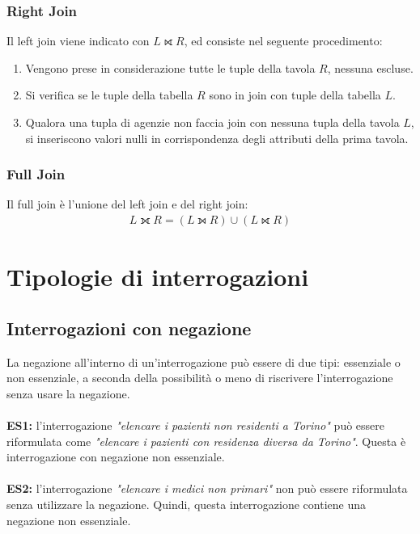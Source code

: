 \subsection{Right Join}
Il left join viene indicato con $L \rightouterjoin R$, ed consiste nel seguente procedimento:
    \begin{enumerate}
        \item{Vengono prese in considerazione tutte le tuple della tavola $R$, nessuna escluse.}
        \item{Si verifica se le tuple della tabella $R$ sono in join con tuple della tabella $L$.}
        \item{Qualora una tupla di agenzie non faccia join con nessuna tupla della tavola $L$, si inseriscono valori nulli in corrispondenza degli attributi della prima tavola.}
    \end{enumerate}

\subsection{Full Join}
Il full join è l'unione del left join e del right join:
    \begin{equation}\begin{aligned}
        L \fullouterjoin R = (L \leftouterjoin R) \cup (L \rightouterjoin R)
    \end{aligned}\end{equation}

\chapter{Tipologie di interrogazioni}
\section{Interrogazioni con negazione}
La negazione all'interno di un'interrogazione può essere di due tipi: essenziale o non essenziale, a seconda della possibilità o meno di riscrivere l'interrogazione senza usare la negazione.\\\\
\textbf{ES1:} l'interrogazione \textit{"elencare i pazienti non residenti a Torino"} può essere riformulata come \textit{"elencare i pazienti con residenza diversa da Torino"}. Questa è interrogazione con negazione non essenziale.\\\\
\textbf{ES2:} l'interrogazione \textit{"elencare i medici non primari"} non può essere riformulata senza utilizzare la negazione. Quindi, questa interrogazione contiene una negazione non essenziale.

